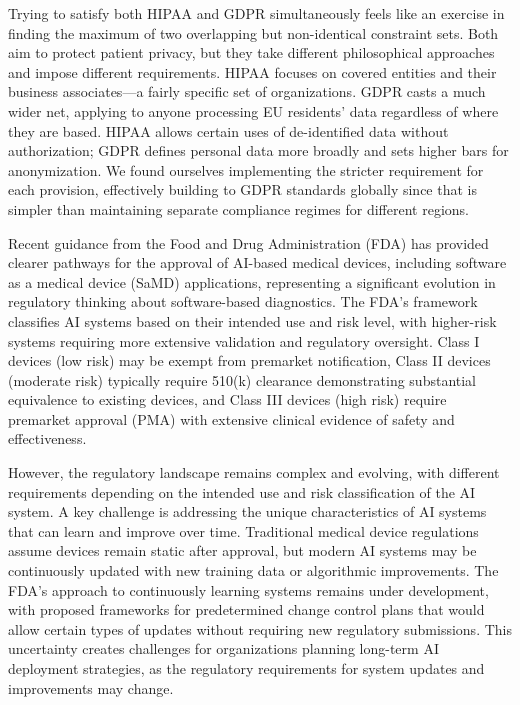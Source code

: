 \documentclass[12pt,a4paper]{article}
\begin{document}
Trying to satisfy both HIPAA and GDPR simultaneously feels like an exercise in finding the maximum of two overlapping but non-identical constraint sets. Both aim to protect patient privacy, but they take different philosophical approaches and impose different requirements. HIPAA focuses on covered entities and their business associates—a fairly specific set of organizations. GDPR casts a much wider net, applying to anyone processing EU residents' data regardless of where they are based. HIPAA allows certain uses of de-identified data without authorization; GDPR defines personal data more broadly and sets higher bars for anonymization. We found ourselves implementing the stricter requirement for each provision, effectively building to GDPR standards globally since that is simpler than maintaining separate compliance regimes for different regions.

Recent guidance from the Food and Drug Administration (FDA) \cite{fda2021ai} has provided clearer pathways for the approval of AI-based medical devices, including software as a medical device (SaMD) applications, representing a significant evolution in regulatory thinking about software-based diagnostics. The FDA's framework classifies AI systems based on their intended use and risk level, with higher-risk systems requiring more extensive validation and regulatory oversight. Class I devices (low risk) may be exempt from premarket notification, Class II devices (moderate risk) typically require 510(k) clearance demonstrating substantial equivalence to existing devices, and Class III devices (high risk) require premarket approval (PMA) with extensive clinical evidence of safety and effectiveness.

However, the regulatory landscape remains complex and evolving, with different requirements depending on the intended use and risk classification of the AI system. A key challenge is addressing the unique characteristics of AI systems that can learn and improve over time. Traditional medical device regulations assume devices remain static after approval, but modern AI systems may be continuously updated with new training data or algorithmic improvements. The FDA's approach to continuously learning systems remains under development, with proposed frameworks for predetermined change control plans that would allow certain types of updates without requiring new regulatory submissions. This uncertainty creates challenges for organizations planning long-term AI deployment strategies, as the regulatory requirements for system updates and improvements may change.
\end{document}
